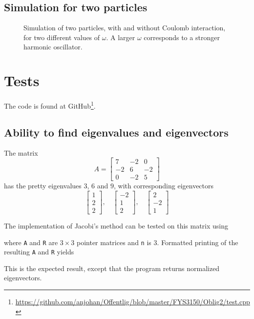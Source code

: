 \documentclass[12pt,english,a4paper]{report}
\begin{document}
\subsection{Simulation for two particles}
\begin{figure}[H]
\centering

\caption{Simulation of two particles, with and without Coulomb interaction, for two different values of \(\omega\). A larger \(\omega\) corresponds to a stronger harmonic oscillator.}
\end{figure}


\section{Tests}
The code is found at GitHub\footnote{\url{https://github.com/anjohan/Offentlig/blob/master/FYS3150/Oblig2/test.cpp}}.
\subsection{Ability to find eigenvalues and eigenvectors}
The matrix
\[
A = \begin{bmatrix}7 & -2 & 0\\ -2 & 6 & -2\\ 0 & -2 & 5\end{bmatrix}
\]
has the pretty eigenvalues \(3\), \(6\) and \(9\), with corresponding eigenvectors
\[
\begin{bmatrix}1 \\ 2 \\ 2\end{bmatrix},\quad
\begin{bmatrix}-2 \\ 1 \\ 2\end{bmatrix}, \quad
\begin{bmatrix}2 \\ -2 \\ 1\end{bmatrix}
\]

The implementation of Jacobi's method can be tested on this matrix using

where \texttt{A} and \texttt{R} are \(3\times3\) pointer matrices and \texttt{n} is \(3\). Formatted printing of the resulting \texttt{A} and \texttt{R} yields

This is the expected result, except that the program returns normalized eigenvectors.
\end{document}
